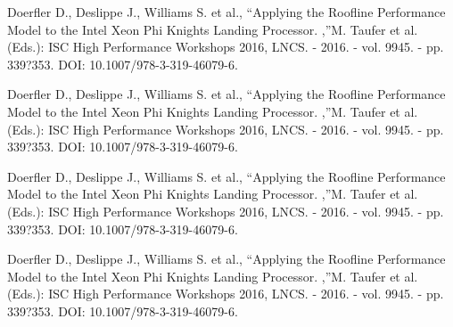 \documentclass[
11pt,%
tightenlines,%
twoside,%
onecolumn,%
nofloats,%
nobibnotes,%
nofootinbib,%
superscriptaddress,%
noshowpacs,%
centertags]%
{revtex4}
\begin{document}
\begin{thebibliography}{99}
Doerfler D., Deslippe J., Williams S. et al., \textquotedblleft Applying the Roofline Performance Model to the Intel Xeon Phi Knights Landing Processor. ,\textquotedblright M. Taufer et al. (Eds.): ISC High Performance Workshops 2016, LNCS. - 2016. - vol. 9945. - pp. 339?353. DOI: 10.1007/978-3-319-46079-6.

Doerfler D., Deslippe J., Williams S. et al., \textquotedblleft Applying the Roofline Performance Model to the Intel Xeon Phi Knights Landing Processor. ,\textquotedblright M. Taufer et al. (Eds.): ISC High Performance Workshops 2016, LNCS. - 2016. - vol. 9945. - pp. 339?353. DOI: 10.1007/978-3-319-46079-6.

Doerfler D., Deslippe J., Williams S. et al., \textquotedblleft Applying the Roofline Performance Model to the Intel Xeon Phi Knights Landing Processor. ,\textquotedblright M. Taufer et al. (Eds.): ISC High Performance Workshops 2016, LNCS. - 2016. - vol. 9945. - pp. 339?353. DOI: 10.1007/978-3-319-46079-6.

Doerfler D., Deslippe J., Williams S. et al., \textquotedblleft Applying the Roofline Performance Model to the Intel Xeon Phi Knights Landing Processor. ,\textquotedblright M. Taufer et al. (Eds.): ISC High Performance Workshops 2016, LNCS. - 2016. - vol. 9945. - pp. 339?353. DOI: 10.1007/978-3-319-46079-6.

\end{thebibliography}
\end{document}
